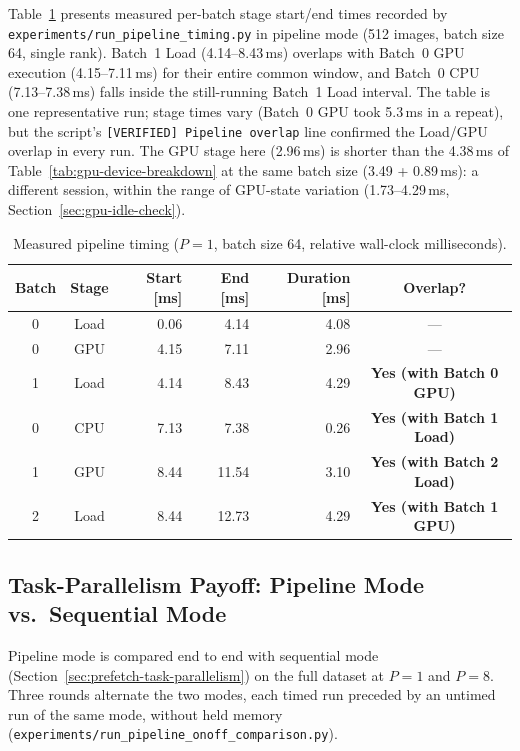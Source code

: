 \documentclass[a4paper,12pt]{report}
\begin{document}
Table~\ref{tab:pipeline-timing} presents measured per-batch
stage start/end times recorded by
\texttt{experiments\slash{}run\_\discretionary{}{}{}pipeline\_\discretionary{}{}{}timing.py} in pipeline mode
(512 images, batch size 64, single rank).
Batch~1 Load (4.14--8.43\,ms) overlaps with Batch~0 GPU execution
(4.15--7.11\,ms) for their entire common window, and Batch~0 CPU
(7.13--7.38\,ms) falls inside the still-running Batch~1 Load interval.
The table is one representative run; stage times vary (Batch~0 GPU took 5.3\,ms
in a repeat), but the script's \texttt{[VERIFIED] Pipeline overlap} line confirmed the
Load/GPU overlap in every run. The GPU stage here (2.96\,ms) is
shorter than the 4.38\,ms of Table~\ref{tab:gpu-device-breakdown} at the same batch size
(3.49 + 0.89\,ms): a different session, within the range of GPU-state variation
(1.73--4.29\,ms, Section~\ref{sec:gpu-idle-check}).

\begin{table}[H]
\centering
\caption{Measured pipeline timing ($P=1$, batch size 64,
relative wall-clock milliseconds).}
\label{tab:pipeline-timing}
\setlength{\tabcolsep}{4pt}
\begin{tabular}{@{}ccrrrc@{}}
\toprule
\textbf{Batch} & \textbf{Stage} &
\textbf{Start [ms]} & \textbf{End [ms]} & \textbf{Duration [ms]} &
\textbf{Overlap?} \\
\midrule
0 & Load  & 0.06 & 4.14 & 4.08 & --- \\
0 & GPU   & 4.15 & 7.11 & 2.96 & --- \\
1 & Load  & 4.14 & 8.43 & 4.29 &
  \textcolor{TealCPU!70!black}{\textbf{Yes (with Batch 0 GPU)}} \\
0 & CPU   & 7.13 & 7.38 & 0.26 &
  \textcolor{TealCPU!70!black}{\textbf{Yes (with Batch 1 Load)}} \\
1 & GPU   & 8.44 & 11.54 & 3.10 &
  \textcolor{TealCPU!70!black}{\textbf{Yes (with Batch 2 Load)}} \\
2 & Load  & 8.44 & 12.73 & 4.29 &
  \textcolor{TealCPU!70!black}{\textbf{Yes (with Batch 1 GPU)}} \\
\bottomrule
\end{tabular}
\end{table}

\subsection{Task-Parallelism Payoff: Pipeline Mode vs.\ Sequential Mode}
\label{sec:pipeline-payoff}

Pipeline mode is compared end to end with sequential mode
(Section~\ref{sec:prefetch-task-parallelism}) on the full dataset at $P=1$ and $P=8$. Three rounds alternate the two
modes, each timed run preceded by an untimed run of the same mode, without held
memory (\texttt{experiments\slash{}run\_\discretionary{}{}{}pipeline\_\discretionary{}{}{}onoff\_\discretionary{}{}{}comparison.py}).
\end{document}
